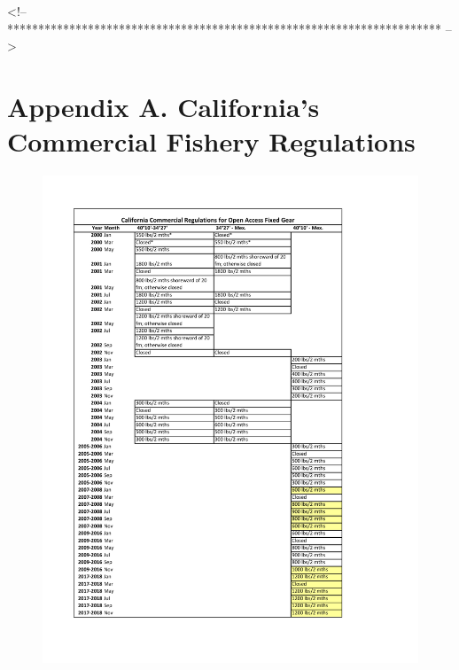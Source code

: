 \documentclass[12pt,]{article}
\begin{document}
\FloatBarrier
<!-- ********************************************************************** -->

\FloatBarrier
\newpage

\hypertarget{appendix-a.-californias-commercial-fishery-regulations}{\section*{Appendix
A. California's Commercial Fishery
Regulations}\label{appendix-a.-californias-commercial-fishery-regulations}}

\renewcommand{\thepage}{A-\arabic{page}}
\renewcommand{\thefigure}{A\arabic{figure}}

\setcounter{page}{1} \setcounter{figure}{1}

\begin{figure}
\centering
\includegraphics{Figures/Comm_regs1.pdf}
\caption{\label{fig:Comm_regs1}}
\end{figure}
\end{document}
